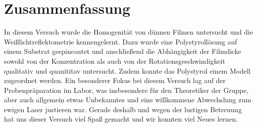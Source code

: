 \section{\label{sec:fazit}Zusammenfassung}
In diesem Versuch wurde die Homogenität von dünnen Filmen untersucht und die Weißlichtreflektometrie kennengelernt. Dazu wurde eine Polystyrollösung auf einem Substrat gespincoatet und anschließend die Abhängigkeit der Filmdicke sowohl von der Konzentration als auch von der Rotationsgeschwindigkeit qualitativ und quanititav untersucht. Zudem konnte das Polystyrol einem Modell zugeordnet werden. Ein besonderer Fokus bei diesem Versuch lag auf der Probenpräparation im Labor, was insbesondere für den Theoretiker der Gruppe, aber auch allgemein etwas Unbekanntes und eine willkommene Abwechslung zum ewigen Laser justieren war. Gerade deshalb und wegen der lustigen Betreuung hat uns dieser Versuch viel Spaß gemacht und wir konnten viel Neues lernen. 